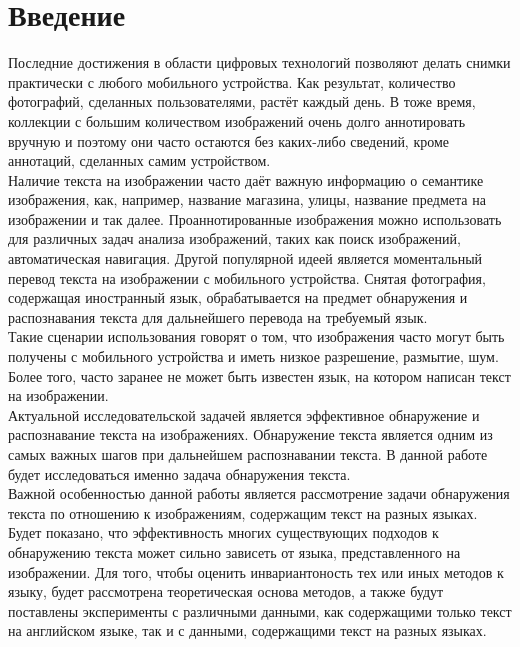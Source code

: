 \documentclass{matmex-diploma-custom}
\begin{document}
\section*{Введение}
Последние достижения в области цифровых технологий позволяют делать снимки практически с любого мобильного устройства. Как результат, количество фотографий, сделанных пользователями, растёт каждый день. В тоже время, коллекции с большим количеством изображений очень долго аннотировать вручную и поэтому они часто остаются без каких-либо сведений, кроме аннотаций, сделанных самим устройством.\\
\indent Наличие текста на изображении часто даёт важную информацию о семантике изображения, как, например, название магазина, улицы, название предмета на изображении и так далее. Проаннотированные изображения можно использовать для различных задач анализа изображений, таких как поиск изображений, автоматическая навигация. Другой популярной идеей является моментальный перевод текста на изображении с мобильного устройства. Снятая фотография, содержащая иностранный язык, обрабатывается на предмет обнаружения и распознавания текста для дальнейшего перевода на требуемый язык.\\
\indent Такие сценарии использования говорят о том, что изображения часто могут быть получены с мобильного устройства и иметь низкое разрешение, размытие, шум. Более того, часто заранее не может быть известен язык, на котором написан текст на изображении.\\ 
\indent Актуальной исследовательской задачей является эффективное обнаружение и распознавание текста на изображениях. Обнаружение текста является одним из самых важных шагов при дальнейшем распознавании текста. В данной работе будет исследоваться именно задача обнаружения текста.\\
\indent Важной особенностью данной работы является рассмотрение задачи обнаружения текста по отношению к изображениям, содержащим текст на разных языках. Будет показано, что эффективность многих существующих подходов к обнаружению текста может сильно зависеть от языка, представленного на изображении. Для того, чтобы оценить инвариантоность тех или иных методов к языку, будет рассмотрена теоретическая основа методов, а также будут поставлены эксперименты с различными данными, как содержащими только текст на английском языке, так и с данными, содержащими текст на разных языках.
\end{document}
